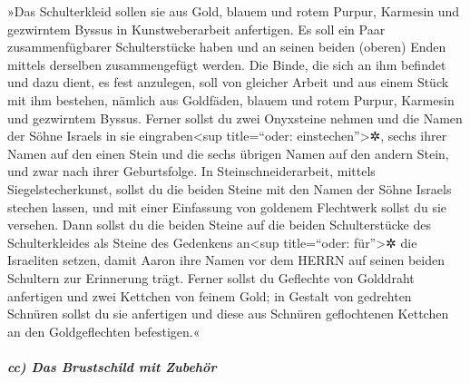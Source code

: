  »Das Schulterkleid sollen sie aus Gold, blauem und rotem
Purpur, Karmesin und gezwirntem Byssus in Kunstweberarbeit anfertigen.
 Es soll ein Paar zusammenfügbarer Schulterstücke haben
und an seinen beiden (oberen) Enden mittels derselben zusammengefügt
werden.  Die Binde, die sich an ihm befindet und dazu
dient, es fest anzulegen, soll von gleicher Arbeit und aus einem Stück
mit ihm bestehen, nämlich aus Goldfäden, blauem und rotem Purpur,
Karmesin und gezwirntem Byssus.  Ferner sollst du zwei
Onyxsteine nehmen und die Namen der Söhne Israels in sie
eingraben\textless sup title=``oder: einstechen''\textgreater✲,
 sechs ihrer Namen auf den einen Stein und die sechs
übrigen Namen auf den andern Stein, und zwar nach ihrer Geburtsfolge.
 In Steinschneiderarbeit, mittels Siegelstecherkunst,
sollst du die beiden Steine mit den Namen der Söhne Israels stechen
lassen, und mit einer Einfassung von goldenem Flechtwerk sollst du sie
versehen.  Dann sollst du die beiden Steine auf die
beiden Schulterstücke des Schulterkleides als Steine des Gedenkens
an\textless sup title=``oder: für''\textgreater✲ die Israeliten setzen,
damit Aaron ihre Namen vor dem HERRN auf seinen beiden Schultern zur
Erinnerung trägt.  Ferner sollst du Geflechte von
Golddraht anfertigen  und zwei Kettchen von feinem Gold;
in Gestalt von gedrehten Schnüren sollst du sie anfertigen und diese aus
Schnüren geflochtenen Kettchen an den Goldgeflechten befestigen.«

\hypertarget{cc-das-brustschild-mit-zubehuxf6r}{%
\subparagraph{cc) Das Brustschild mit
Zubehör}\label{cc-das-brustschild-mit-zubehuxf6r}}

